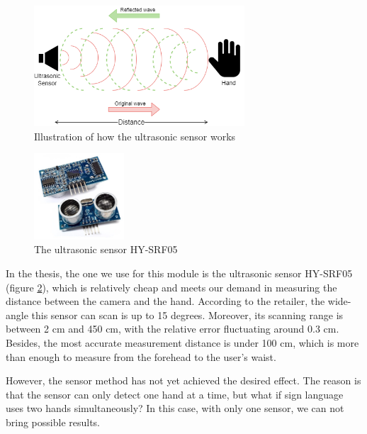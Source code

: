 \begin{figure}[H]
	\centering
	\includegraphics[width=0.7\textwidth]{img/Chap4/UltrasonicSensorFunction.png}
	\caption{Illustration of how the ultrasonic sensor works}
	\label{fig:Chap4-UltrasonicSensorFunction}
\end{figure}

\begin{figure}
  \begin{center}
  	\includegraphics[width=0.3\textwidth]{img/Chap4/UltrasonicSensor.jpeg}
  \end{center}
	\caption{The ultrasonic sensor HY-SRF05}
  \label{fig:Chap4-UltrasonicSensorHYSRF05}
\end{figure}

In the thesis, the one we use for this module is the ultrasonic sensor HY-SRF05 (figure \ref{fig:Chap4-UltrasonicSensorHYSRF05}), which is relatively cheap and meets our demand in measuring the distance between the camera and the hand. According to the retailer, the wide-angle this sensor can scan is up to 15 degrees. Moreover, its scanning range is between 2 cm and 450 cm, with the relative error fluctuating around 0.3 cm. Besides, the most accurate measurement distance is under 100 cm, which is more than enough to measure from the forehead to the user's waist.

However, the sensor method has not yet achieved the desired effect. The reason is that the sensor can only detect one hand at a time, but what if sign language uses two hands simultaneously? In this case, with only one sensor, we can not bring possible results.

